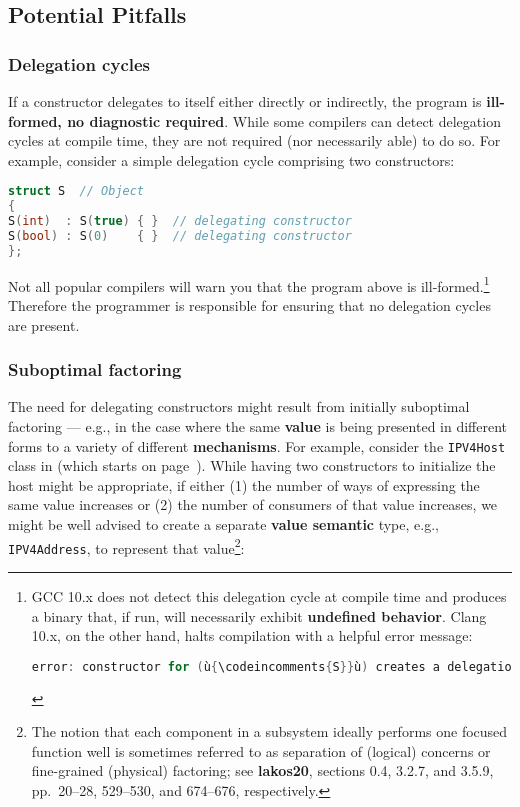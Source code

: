 \subsection[Potential Pitfalls]{Potential Pitfalls}\label{ctordelegrating-potential-pitfalls}

\subsubsection[Delegation cycles]{Delegation cycles}\label{delegation-cycles}

If a constructor delegates to itself either directly or indirectly, the
program is \textbf{ill-formed, no diagnostic required}. While some
compilers can detect delegation cycles at compile time, they are not
required (nor necessarily able) to do so. For example, consider a simple
delegation cycle comprising two constructors:

\begin{lstlisting}[language=C++]
struct S  // Object
{
S(int)  : S(true) { }  // delegating constructor
S(bool) : S(0)    { }  // delegating constructor
};
\end{lstlisting}

\noindent Not all popular compilers will warn you that the program above is
ill-formed.{\cprotect\footnote{GCC 10.x does not detect this delegation
cycle at compile time and produces a binary that, if run, will
necessarily exhibit \textbf{undefined behavior}. Clang 10.x, on the
other hand, halts compilation with a helpful error message:

\begin{lstlisting}[language=C++, basicstyle={\ttfamily\footnotesize}]
error: constructor for (ù{\codeincomments{S}}ù) creates a delegation cycle
\end{lstlisting}\vspace*{-1ex}
}} Therefore the programmer is responsible for ensuring that
no delegation cycles are present.

\subsubsection[Suboptimal factoring]{Suboptimal factoring}\label{suboptimal-factoring}

The need for delegating constructors might result from initially
suboptimal factoring --- e.g., in the case where the same \textbf{value}
is being presented in different forms to a variety of different
\textbf{mechanisms}. For example, consider the \texttt{IPV4Host} class
in {\it{}} (which starts on page~\pageref{ctordelegating-use-cases}). While having two constructors to
initialize the host might be appropriate, if either (1) the number of
ways of expressing the same value increases or (2) the number of
consumers of that value increases, we might be well advised to create a
separate \textbf{value semantic} type, e.g., \texttt{IPV4Address}, to
represent that value{\cprotect\footnote{The notion that each component
in a subsystem ideally performs one focused function well is sometimes
referred to as separation of (logical) concerns or
fine-grained (physical) factoring; see \textbf{{lakos20}},
sections 0.4, 3.2.7, and 3.5.9, pp.~20--28, 529--530, and 674--676,
respectively.}}:

